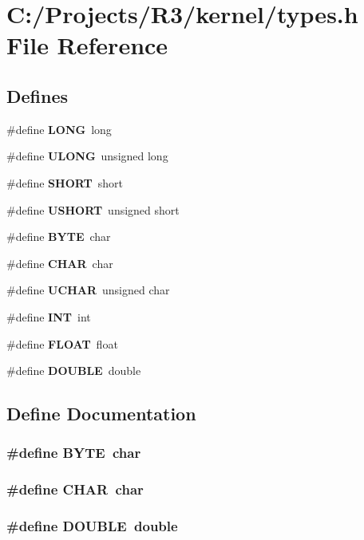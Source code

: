 \section{C:/Projects/R3/kernel/types.h File Reference}
\label{kernel_2types_8h}
\subsection*{Defines}
\begin{DoxyCompactItemize}
\item 
\#define {\bf LONG}~long
\item 
\#define {\bf ULONG}~unsigned long
\item 
\#define {\bf SHORT}~short
\item 
\#define {\bf USHORT}~unsigned short
\item 
\#define {\bf BYTE}~char
\item 
\#define {\bf CHAR}~char
\item 
\#define {\bf UCHAR}~unsigned char
\item 
\#define {\bf INT}~int
\item 
\#define {\bf FLOAT}~float
\item 
\#define {\bf DOUBLE}~double
\end{DoxyCompactItemize}


\subsection{Define Documentation}
\subsubsection[{BYTE}]{\setlength{\rightskip}{0pt plus 5cm}\#define BYTE~char}\label{kernel_2types_8h_aec93e83855ac17c3c25c55c37ca186dd}
\subsubsection[{CHAR}]{\setlength{\rightskip}{0pt plus 5cm}\#define CHAR~char}\label{kernel_2types_8h_a35cd67ba7bb0db8105eb6267467535d7}
\subsubsection[{DOUBLE}]{\setlength{\rightskip}{0pt plus 5cm}\#define DOUBLE~double}\label{kernel_2types_8h_a8747af38b86aa2bbcda2f1b1aa0888c2}
